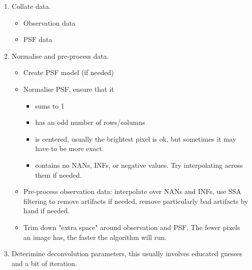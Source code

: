 \begin{enumerate}

	\item Collate data.
	\begin{itemize}
		\item Observation data
		\item PSF data
	\end{itemize}
	
	\item Normalise and pre-process data.
	\begin{itemize}
		\item Create PSF model (if needed)
		\item Normalise PSF, ensure that it
			\begin{itemize}
				\item sums to 1
				\item has an odd number of rows/columns
				\item is centered, usually the brightest pixel is ok, but sometimes it may have to be more exact.
				\item contains no NANs, INFs, or negative values. Try interpolating across them if needed.
			\end{itemize}
		\item Pre-process observation data: interpolate over NANs and INFs, use SSA filtering to remove artifacts if needed, remove particularly bad artifacts by hand if needed.
		\item Trim down "extra space" around observation and PSF. The fewer pixels an image has, the faster the algorithm will run.
	\end{itemize}

	\item \label{itm:set_deconv_params} Deterimine deconvolution parameters, this usually involves educated guesses and a bit of iteration.
	

\end{enumerate}
